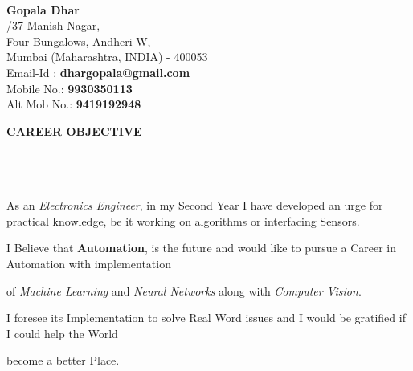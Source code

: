 \documentclass[a4paper,10pt]{article}
\newcommand{\lsep}{-0.5cm}
\newcommand{\resheading}[1]{{\small \colorbox{mygrey}{\begin{minipage}{0.975\textwidth}{\textbf{#1 \vphantom{p\^{E}}}}\end{minipage}}}}
\begin{document}
\hspace{0.5cm}\\[-0.2cm]
\indent \Large \textbf{Gopala Dhar} \\         
\normalsize
{}/37 Manish Nagar, \\
\indent Four Bungalows, Andheri W,  \\                                                                                                                                                                                                                                                           
\indent Mumbai (Maharashtra, INDIA) - 400053\\
\indent Email-Id : \textbf{dhargopala@gmail.com} \\
\indent Mobile No.: \textbf{9930350113} \\
\indent Alt Mob No.: \textbf{9419192948} \hfill
{}\\  


\resheading{\textbf{CAREER OBJECTIVE} }\\[\lsep]\\\\
\indent As an \textit{Electronics Engineer}, in my Second Year I have developed an urge for practical knowledge, be it working \indent on algorithms or interfacing Sensors.\par I Believe that \textbf{Automation}, is the future and would like to pursue a Career in Automation with implementation \par of \textit{Machine Learning} and \textit{Neural Networks} along with \textit{Computer Vision}. \par I foresee its Implementation to solve Real Word issues and I would be gratified if I could help the World \par become a better Place.\\
\end{document}
